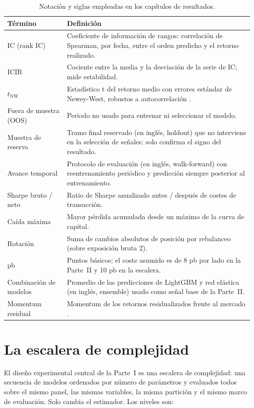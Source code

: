 \begin{table}[htbp]
\centering
\caption{Notación y siglas empleadas en los capítulos de resultados.}
\label{tab:notacion}
\small
\begin{tabular}{lp{10.2cm}}
\toprule
Término & Definición \\
\midrule
IC (rank IC) & Coeficiente de información de rangos: correlación de Spearman, por fecha,
entre el orden predicho y el retorno realizado. \\
ICIR & Cociente entre la media y la desviación de la serie de IC; mide estabilidad. \\
$t_{\text{NW}}$ & Estadístico t del retorno medio con errores estándar de Newey-West,
robustos a autocorrelación \autocite{neweywest1987}. \\
Fuera de muestra (OOS) & Periodo no usado para entrenar ni seleccionar el modelo. \\
Muestra de reserva & Tramo final reservado (en inglés, holdout) que no interviene en la
selección de señales; solo confirma el signo del resultado. \\
Avance temporal & Protocolo de evaluación (en inglés, walk-forward) con reentrenamiento
periódico y predicción siempre posterior al entrenamiento. \\
Sharpe bruto / neto & Ratio de Sharpe anualizado antes / después de costes de
transacción. \\
Caída máxima & Mayor pérdida acumulada desde un máximo de la curva de capital. \\
Rotación & Suma de cambios absolutos de posición por rebalanceo (sobre exposición
bruta 2). \\
pb & Puntos básicos; el coste asumido es de 8 pb por lado en la Parte~II y 10 pb en la
escalera. \\
Combinación de modelos & Promedio de las predicciones de LightGBM y red elástica (en
inglés, ensemble) usado como señal base de la Parte~II. \\
Momentum residual & Momentum de los retornos residualizados frente al mercado
\autocite{blitz2011residual}. \\
\bottomrule
\end{tabular}
\end{table}

\section{La escalera de complejidad}\label{sec:met-ladder}

El diseño experimental central de la Parte~I es una escalera de complejidad: una secuencia
de modelos ordenados por número de parámetros y evaluados todos sobre el mismo panel, las
mismas variables, la misma partición y el mismo marco de evaluación. Solo cambia el
estimador. Los niveles son:

